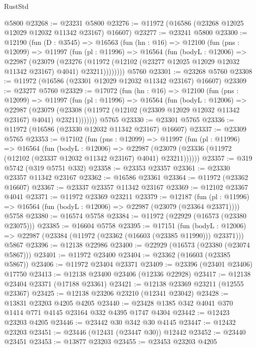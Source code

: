 \begin{lexlean}{RustStd}
\begin{coremodule}
    @5800
@23268 := @23231 @5800
@23276 := @11972 (@16586 (@23268 @12025 @12029 @12032 @11342 @23167) @16607)
@23277 := @23241 @5800
@23300 := @12190
    (fun (D : @3545) =>
    @16563
      (fun (hn : @16) =>
      @12100
        (fun (pns : @12099) =>
        @11997
          (fun (pl : @11996) =>
          @16564
            (fun (bodyL : @12006) =>
            @22987
              (@23079
                (@23276
                  (@11972 (@12102 (@23277 @12025 @12029 @12032 @11342 @23167) @4041) @23211))))))))
    @5760
@23301 := @23268 @5760
@23308 := @11972 (@16586 (@23301 @12029 @12032 @11342 @23167) @16607)
@23309 := @23277 @5760
@23329 := @17072
    (fun (hn : @16) =>
    @12100
      (fun (pns : @12099) =>
      @11997
        (fun (pl : @11996) =>
        @16564
          (fun (bodyL : @12006) =>
          @22987
            (@23079
              (@23308 (@11972 (@12102 (@23309 @12029 @12032 @11342 @23167) @4041) @23211)))))))
    @5765
@23330 := @23301 @5765
@23336 := @11972 (@16586 (@23330 @12032 @11342 @23167) @16607)
@23337 := @23309 @5765
@23353 := @17102
    (fun (pns : @12099) =>
    @11997
      (fun (pl : @11996) =>
      @16564
        (fun (bodyL : @12006) =>
        @22987 (@23079 (@23336 (@11972 (@12102 (@23337 @12032 @11342 @23167) @4041) @23211))))))
@23357 := @319 @5742 (@319 @5751 @332)
@23358 := @23353 @23357
@23361 := @23330 @23357 @11342 @23167
@23362 := @16586 @23361
@23364 := @11972 (@23362 @16607)
@23367 := @23337 @23357 @11342 @23167
@23369 := @12102 @23367 @4041
@23371 := @11972 @23369 @23211
@23379 := @12187
    (fun (pl : @11996) => @16564 (fun (bodyL : @12006) => @22987 (@23079 (@23364 @23371))))
    @5758
@23380 := @16574 @5758
@23384 := @11972 (@22929 (@16573 (@23380 @23075)))
@23385 := @16604 @5758
@23395 := @17151
    (fun (bodyL : @12006) => @22987 (@23384 (@11972 (@23362 (@16603 (@23385 @11990))) @23371)))
    @5867
@23396 := @12138 @22986
@23400 := @22929 (@16573 (@23380 (@23074 @5867)))
@23401 := @11972 @23400
@23404 := @23362 (@16603 (@23385 @5867))
@23406 := @11972 @23404 @23371
@23409 := @23396 (@23401 @23406) @17750
@23413 := @12138 @23400 @23406 (@12336 @22928)
@23417 := @12138 @23404 @23371 (@17188 @23361)
@23421 := @12138 @23369 @23211 (@12555 @23367)
@23425 := @12138 @23206 @23210 (@12341 @23042)
@23428 := @13831 @23203 @4205 @4205
@23440 := @23428 @1385 @342 @4041 @370 @1414 @771 @4145 @23164 @332 @4395 @1747 @4304
@23442 := @12423 @23203 @4205
@23446 := @23442 @30 @342 @30 @4145
@23447 := @12432 @23203
@23451 := @23446 (@12431 (@23447 @30)) @12442
@23452 := @23440 @23451
@23453 := @13877 @23203
@23455 := @23453 @23203 @4205

\end{coremodule}
\end{lexlean}

